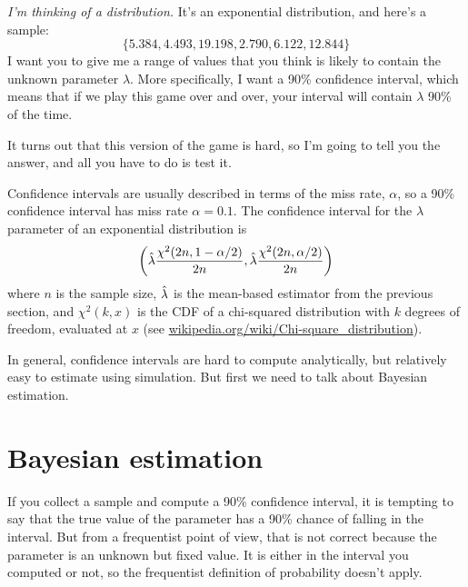 \documentclass[12pt]{book}
\begin{document}
{\em I'm thinking of a distribution.}  It's an exponential distribution, and 
here's a sample:
%
\[ \{ 5.384, 4.493, 19.198, 2.790, 6.122, 12.844 \} \]
%
I want you to give me a range of values that you think is likely to
contain the unknown parameter $\lambda$.  More specifically, I want
a 90\% confidence interval, which means that if we play this game over
and over, your interval will contain $\lambda$ 90\% of the time.

It turns out that this version of the game is hard, so I'm going
to tell you the answer, and all you have to do is test it.

Confidence intervals are usually described in terms of the miss rate,
$\alpha$, so a 90\% confidence interval has miss rate $\alpha = 0.1$.
The confidence interval for the $\lambda$ parameter of an exponential
distribution is
%
\[ \left( \hat{\lambda} \frac{\chi^2(2n, 1-\alpha/2)}{2n},
      \hat{\lambda} \frac{\chi^2(2n, \alpha/2)}{2n} \right) \]
%
where $n$ is the sample size, $\hat{\lambda}$ is the mean-based estimator
from the previous section, and $\chi^2(k, x)$ is the CDF of a
chi-squared distribution with $k$ degrees of freedom, evaluated at $x$
(see \url{wikipedia.org/wiki/Chi-square_distribution}).

In general, confidence intervals are hard to compute analytically, but
relatively easy to estimate using simulation.  But first we need
to talk about Bayesian estimation.








\section{Bayesian estimation}

If you collect a sample and compute a 90\% confidence interval, it is
tempting to say that the true value of the parameter has a 90\% chance
of falling in the interval.  But from a frequentist point of view,
that is not correct because the parameter is an unknown but fixed
value.  It is either in the interval you computed or not, so the
frequentist definition of probability doesn't apply.
\end{document}
